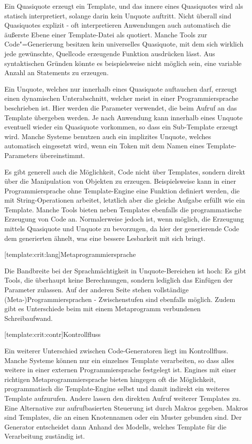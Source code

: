\documentclass[11pt, a4paper, bibgerm]{scrbook}
\newcommand\lsubsection{}
\newcommand{\cgen}{Code"=Generierung}
\begin{document}
Ein Quasiquote erzeugt ein Template, und das innere eines Quasiquotes
wird als statisch interpretiert, solange darin kein Unquote
auftritt. Nicht überall sind Quasiquotes explizit - oft interpretieren
Anwendungen auch automatisch die äußerste Ebene einer Template-Datei als
quotiert. Manche Tools zur \cgen{} besitzen kein universelles
Quasiquote, mit dem sich wirklich jede gewünschte, Quellcode erzeugende
Funktion ausdrücken lässt. Aus syntaktischen Gründen könnte es
beispielsweise nicht möglich sein, eine variable Anzahl an Statements zu
erzeugen.

Ein Unquote, welches nur innerhalb eines Quasiquote auftauchen darf,
erzeugt einen dynamischen Unterabschnitt, welcher meist in einer
Programmiersprache beschrieben ist. Hier werden die Parameter verwendet,
die beim Aufruf an das Template übergeben werden. Je nach Anwendung kann
innerhalb eines Unquote eventuell wieder ein Quasiquote vorkommen, so
dass ein Sub-Template erzeugt wird. Manche Systeme benutzen auch ein
implizites Unquote, welches automatisch eingesetzt wird, wenn ein Token
mit dem Namen eines Template-Parameters übereinstimmt.

Es gibt generell auch die Möglichkeit, Code nicht über Templates,
sondern direkt über die Manipulation von Objekten zu
erzeugen. Beispielsweise kann in einer Programmiersprache ohne
Template-Engine eine Funktion definiert werden, die mit String-Operationen
arbeitet, letztlich aber die gleiche Aufgabe erfüllt wie ein
Template. Manche Tools bieten neben Templates ebenfalls die
programmatische Erzeugung von Code an. Normalerweise jedoch ist, wenn
möglich, die Erzeugung mittels Quasiquote und Unquote zu bevorzugen, da hier
der generierende Code dem generierten ähnelt, was eine bessere
Lesbarkeit mit sich bringt.

\lsubsection[template:crit:lang]{Metaprogrammiersprache}

Die Bandbreite bei der Sprachmächtigkeit in Unquote-Bereichen ist hoch:
Es gibt Tools, die überhaupt keine Berechnungen, sondern lediglich das
Einfügen der Parameter zulassen. Auf der anderen Seite stehen
vollständige (Meta-)Programmiersprachen - Zwischenstufen sind ebenfalls
möglich. Zudem gibt es Unterschiede beim mit einem Metaprogramm
verbundenen Schreibaufwand.

\lsubsection[template:crit:contr]{Kontrollfluss}

Ein weiterer Unterschied zwischen Code-Generatoren liegt im
Kontrollfluss. Manche Systeme können nur ein einzelnes Template
verarbeiten, so dass alles weitere in einer externen Programmiersprache
festgelegt ist. Engines mit einer richtigen Metaprogrammiersprache
bieten hingegen oft die Möglichkeit, programmatisch die Template-Engine
selbst und damit indirekt ein weiteres Template aufzurufen. Andere
lassen den direkten Aufruf weiterer Templates zu. Eine Alternative zur
aufrufbasierten Steuerung ist durch Makros gegeben. Makros sind
Templates, die an einen Knotennamen oder ein Muster gebunden sind. Der
Generator entscheidet dann Anhand des Modells, welches Template für die
Verarbeitung zuständig ist.
\end{document}
